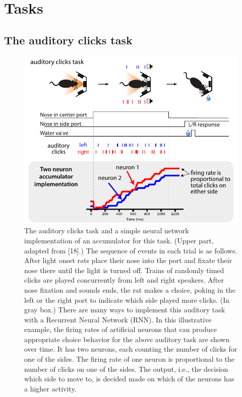 \documentclass{article}
\newcounter{ct}
\theoremstyle{definition}
\theoremstyle{remark}
\begin{document}
\newpage
\section{Tasks}
\subsection{The auditory clicks task}
\begin{figure}[H]
    \centering
    \includegraphics{figures/task_pi_v1.pdf}
    \caption{The auditory clicks task and a simple neural network implementation of an accumulator for this task.
    (Upper part, adapted from [18].) %
    The sequence of events in each trial is as follows. 
    After light onset rats place their nose into the port and fixate their nose there until the light is turned off. 
    Trains of randomly timed clicks are played concurrently from left and right speakers.
    After nose fixation and sounds ends, the rat makes a choice, poking in the left or the right port to indicate which side played more clicks.
    (In gray box.) There are many ways to implement this auditory task with a Recurrent Neural Network (RNN). In this illustrative example, the firing rates of artificial neurons that can produce appropriate choice behavior for the above auditory task are shown over time. It has two neurons, each counting the number of clicks for one of the sides. The firing rate of one neuron is proportional to the number of clicks on one of the sides. The output, i.e., the decision which side to move to, is decided made on which of the neurons has a higher activity.  }%
    \label{fig:task_pi_v1}
\end{figure}
\end{document}
